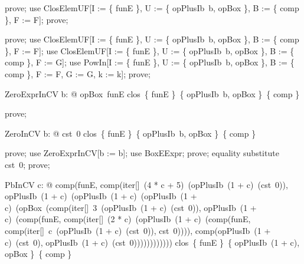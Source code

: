 \documentclass{article}
\begin{document}

\begin{zproof}
prove;
use ClosElemUF[I := \{ funE \}, U := \{ opPlusIb~b, opBox \}, B := \{ comp \}, F := F];
prove;
\end{zproof}


\begin{zproof}
prove;
use ClosElemUF[I := \{ funE \}, U := \{ opPlusIb~b, opBox \}, B := \{ comp \}, F := F];
use ClosElemUF[I := \{ funE \}, U := \{ opPlusIb~b, opBox \}, B := \{ comp \}, F := G];
use PowIn[I := \{ funE \}, U := \{ opPlusIb~b, opBox \}, B := \{ comp \}, F := F, G := G, k := k];
prove;
\end{zproof}

\begin{theorem}{ZeroExprInCV}
  \forall b: \nat @ opBox~funE \in clos~\{ funE \}~\{ opPlusIb~b, opBox \}~\{ comp \}
\end{theorem}

\begin{zproof}
prove;
\end{zproof}

\begin{theorem}{ZeroInCV}
  \forall b: \nat @ cst~0 \in clos~\{ funE \}~\{ opPlusIb~b, opBox \}~\{ comp \}
\end{theorem}

\begin{zproof}
prove;
use ZeroExprInCV[b := b];
use BoxEExpr;
prove;
equality substitute cst~0;
prove;
\end{zproof}

\begin{theorem}{PbInCV}
  \forall c: \nat @ comp(funE, comp(iter[\nat]~(4 * c + 5)~(opPlusIb~(1 + c)~(cst~0)), opPlusIb~(1 + c)~(opPlusIb~(1 + c)~(opPlusIb~(1 + c)~(opBox~(comp(iter[\nat]~3~(opPlusIb~(1 + c)~(cst~0)), opPlusIb~(1 + c)~(comp(funE, comp(iter[\nat]~(2 * c)~(opPlusIb~(1 + c)~(comp(funE, comp(iter[\nat]~c~(opPlusIb~(1 + c)~(cst~0)), cst~0)))), comp(opPlusIb~(1 + c)~(cst~0), opPlusIb~(1 + c)~(cst~0)))))))))))) \in clos~\{ funE \}~\{ opPlusIb~(1 + c), opBox \}~\{ comp \}
\end{theorem}
\end{document}
